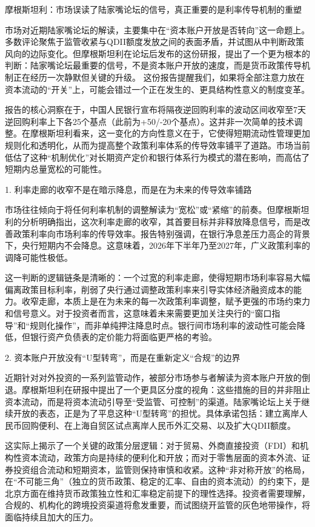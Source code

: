 \documentclass[11pt]{ctexart}
\begin{document}
摩根斯坦利：市场误读了陆家嘴论坛的信号，真正重要的是利率传导机制的重塑

市场对近期陆家嘴论坛的解读，主要集中在“资本账户开放是否转向”这一命题上。多数评论聚焦于监管收紧与QDII额度发放之间的表面矛盾，并试图从中判断政策风向的边际变化。但摩根斯坦利在论坛后发布的这份研报，提出了一个更为根本的判断：陆家嘴论坛最重要的信号，不是资本账户开放的速度，而是货币政策传导机制正在经历一次静默但关键的升级。 这份报告提醒我们，如果将全部注意力放在资本流动的“开关”上，可能会错过一个正在发生的、更具结构性意义的制度变革。

报告的核心洞察在于，中国人民银行宣布将隔夜逆回购利率的波动区间收窄至7天逆回购利率上下各25个基点（此前为+50/-20个基点）。这并非一次简单的技术调整。在摩根斯坦利看来，这一变化的方向性意义在于，它使得短期流动性管理更加规则化和透明化，从而为提高整个政策利率体系的传导效率铺平了道路。市场当前低估了这种“机制优化”对长期资产定价和银行体系行为模式的潜在影响，而高估了短期内总量宽松的可能性。

1. 利率走廊的收窄不是在暗示降息，而是在为未来的传导效率铺路

市场往往倾向于将任何利率机制的调整解读为“宽松”或“紧缩”的前奏。但摩根斯坦利的分析明确指出，这次利率走廊的收窄，其首要目标并非释放降息信号，而是改善政策利率向市场利率的传导效率。报告特别强调，在银行净息差压力高企的背景下，央行短期内不会降息。这意味着，2026年下半年乃至2027年，广义政策利率的调降可能性极低。

这一判断的逻辑链条是清晰的：一个过宽的利率走廊，使得短期市场利率容易大幅偏离政策目标利率，削弱了央行通过调整政策利率来引导实体经济融资成本的能力。收窄走廊，本质上是在为未来的每一次政策利率调整，赋予更强的市场约束力和信号意义。对于投资者而言，这意味着未来需要更加关注央行的“窗口指导”和“规则化操作”，而非单纯押注降息时点。银行间市场利率的波动性可能会降低，但银行资产负债表的定价能力将面临更严格的考验。

2. 资本账户开放没有“U型转弯”，而是在重新定义“合规”的边界

近期针对对外投资的一系列监管动作，被部分市场参与者解读为资本账户开放的倒退。摩根斯坦利在研报中提出了一个更具区分度的视角：这些措施的目的并非阻止资本流动，而是将资本流动引导至“受监管、可控制”的渠道。陆家嘴论坛上关于继续开放的表态，正是为了平息这种“U型转弯”的担忧。具体承诺包括：建立离岸人民币回购便利、在上海自贸区试点离岸人民币外汇交易、以及扩大QDII额度。

这实际上揭示了一个关键的政策分层逻辑：对于贸易、外商直接投资（FDI）和机构性资本流动，政策方向是持续的便利化和开放；而对于零售层面的资本外流、证券投资组合流动和短期资本，监管则保持审慎和收紧。这种“非对称开放”的格局，在“不可能三角”（独立的货币政策、稳定的汇率、自由的资本流动）的约束下，是北京方面在维持货币政策独立性和汇率稳定前提下的理性选择。投资者需要理解，合规的、机构化的跨境投资渠道将愈发重要，而试图绕开监管的灰色地带操作，将面临持续且加大的压力。
\end{document}
